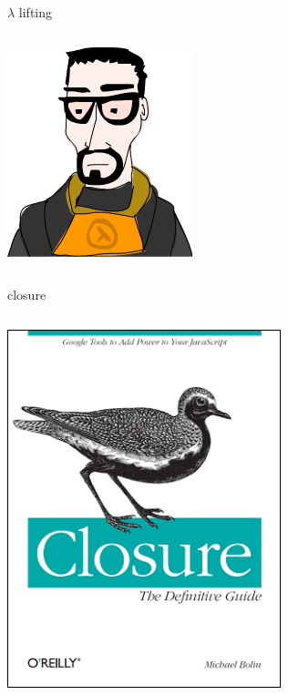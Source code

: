 \documentclass{beamer}
\begin{document}
\begin{frame}{$\lambda$ lifting}
  \begin{columns}
    \begin{column}[b]{3.8cm}
      \includegraphics[scale=0.4]{lambda}
    \end{column}
    \begin{column}[b]{6.2cm}
      
      
    \end{column}
  \end{columns}
\end{frame}

\begin{frame}{closure}
  \begin{columns}
    \begin{column}[b]{3.8cm}
      \includegraphics[scale=0.3]{closure}
    \end{column}
    \begin{column}[b]{6.2cm}
      
    \end{column}
  \end{columns}
\end{frame}

\begin{frame}
  
\end{frame}
\end{document}
